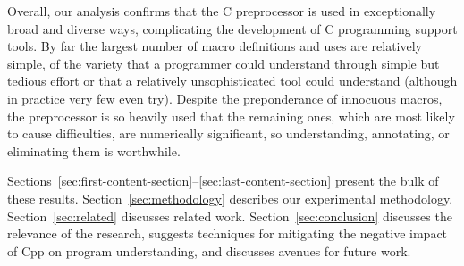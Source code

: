 \documentclass[10pt]{article}
\def\numpackages{30}
\begin{document}
Overall, our analysis confirms that the C preprocessor is used in
exceptionally broad and diverse ways, complicating the development of C
programming support tools.  By far the largest number of macro definitions
and uses are relatively simple, of the variety that a programmer could
understand through simple but tedious effort or that a relatively
unsophisticated tool could understand (although in practice very few even
try).  Despite the preponderance of innocuous macros, the preprocessor is
so heavily used that the remaining ones, which are most likely to cause
difficulties, are numerically significant, so understanding, annotating, or
eliminating them is worthwhile.

Sections~\ref{sec:first-content-section}--\ref{sec:last-content-section}
present the bulk of these results.  Section~\ref{sec:methodology} describes
our experimental methodology.  Section~\ref{sec:related} discusses related
work.  Section~\ref{sec:conclusion} discusses the relevance of the
research, suggests techniques for mitigating the negative impact of Cpp on
program understanding, and discusses avenues for future work.


% 
% 
% 
% 
% 
\end{document}
